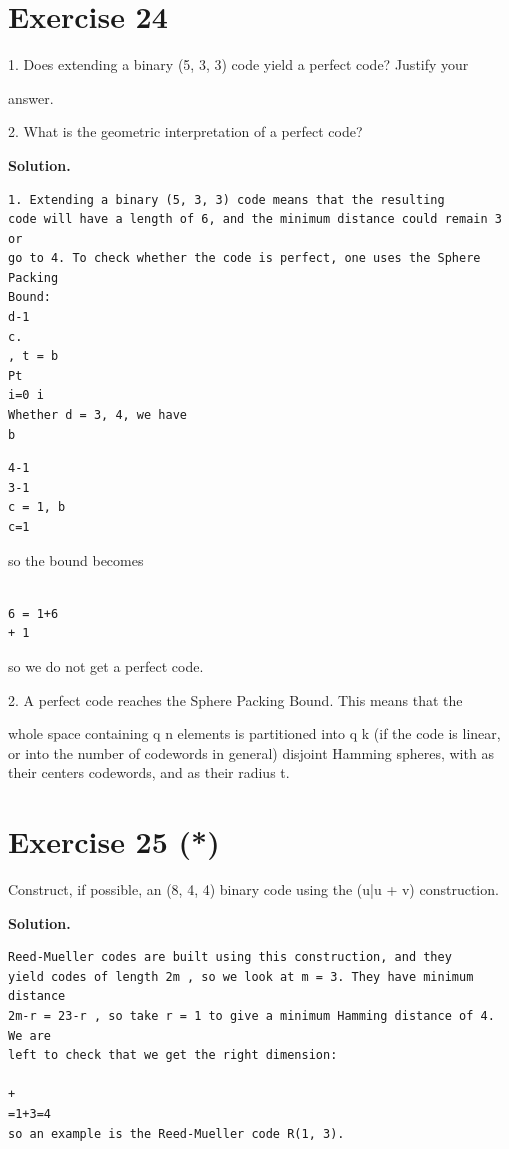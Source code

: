 \documentclass[11pt]{article}
\begin{document}
\section*{Exercise 24}
\begin{exercisebox}
1. Does extending a binary (5, 3, 3) code yield a perfect code? Justify your

answer.

2. What is the geometric interpretation of a perfect code?

\end{exercisebox}
\begin{solutionbox}
\textbf{Solution.}

\begin{Verbatim}[fontsize=\small]
1. Extending a binary (5, 3, 3) code means that the resulting
code will have a length of 6, and the minimum distance could remain 3 or
go to 4. To check whether the code is perfect, one uses the Sphere Packing
Bound:
d-1
c.
, t = b
Pt
i=0 i
Whether d = 3, 4, we have
b
\end{Verbatim}
\begin{Verbatim}[fontsize=\small]
4-1
3-1
c = 1, b
c=1
\end{Verbatim}
so the bound becomes



\begin{Verbatim}[fontsize=\small]

6 = 1+6
+ 1
\end{Verbatim}
so we do not get a perfect code.

2. A perfect code reaches the Sphere Packing Bound. This means that the

whole space containing q n elements is partitioned into q k (if the code is linear, or into the number of codewords in general) disjoint Hamming spheres, with as their centers codewords, and as their radius t.

\end{solutionbox}
\section*{Exercise 25 (*)}
\begin{exercisebox}
Construct, if possible, an (8, 4, 4) binary code using the (u|u + v) construction.

\end{exercisebox}
\begin{solutionbox}
\textbf{Solution.}

\begin{Verbatim}[fontsize=\small]
Reed-Mueller codes are built using this construction, and they
yield codes of length 2m , so we look at m = 3. They have minimum distance
2m-r = 23-r , so take r = 1 to give a minimum Hamming distance of 4. We are
left to check that we get the right dimension:
   
+
=1+3=4
so an example is the Reed-Mueller code R(1, 3).
\end{Verbatim}
\end{solutionbox}
\end{document}
